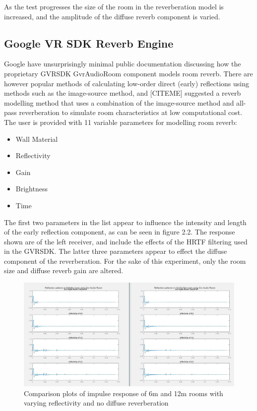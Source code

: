 \documentclass[paper=a4, fontsize=10pt, font=arial]{scrartcl} %
\numberwithin{equation}{section} %
\numberwithin{figure}{section} %
\numberwithin{table}{section} %
\begin{document}
As the test progresses the size of the room in the reverberation model is increased, and the amplitude of the diffuse reverb component is varied.

	\subsection{Google VR SDK Reverb Engine}
Google have unsurprisingly minimal public documentation discussing how the proprietary GVRSDK GvrAudioRoom component models room reverb. There are however popular methods of calculating low-order direct (early) reflections using methods such as the image-source method, and [CITEME] suggested a reverb modelling method that uses a combination of the image-source method and all-pass reverberation to simulate room characteristics at low computational cost. The user is provided with 11 variable parameters for modelling room reverb:
\begin{itemize}
  \item Wall Material
  \item Reflectivity
  \item Gain
  \item Brightness
  \item Time
\end{itemize}
The first two parameters in the list appear to influence the intensity and length of the early reflection component, as can be seen in figure 2.2. The response shown are of the left receiver, and include the effects of the HRTF filtering used in the GVRSDK. The latter three parameters appear to effect the diffuse component of the reverberation. For the sake of this experiment, only the room size and diffuse reverb gain are altered. 

\begin{figure}[H]
\centering
\includegraphics[width=1.0\textwidth]{ir6m12m.jpg}
\centering
\caption{Comparison plots of impulse response of 6m and 12m rooms with varying reflectivity and no diffuse reverberation}
\end{figure}
\end{document}
